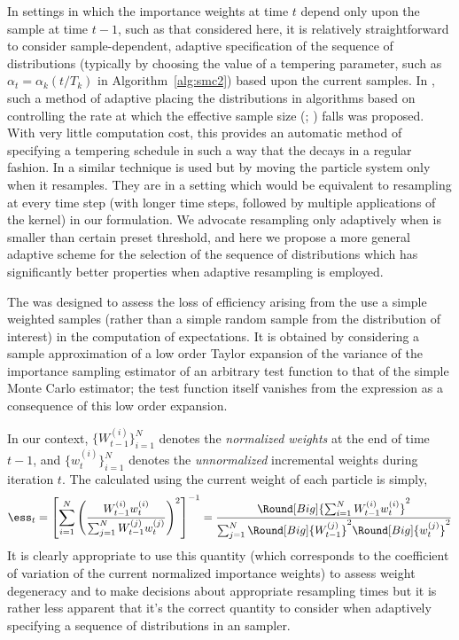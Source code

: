 In settings in which the importance weights at time $t$ depend only upon the
sample at time $t-1$, such as that considered here, it is relatively
straightforward to consider sample-dependent, adaptive specification of the
sequence of distributions (typically by choosing the value of a tempering
parameter, such as $\alpha_t = \alpha_k(t/T_k)$ in Algorithm~\ref{alg:smc2})
based upon the current samples. In \cite{Jasra:2010eh}, such a method of
adaptive placing the distributions in \smc algorithms based on controlling the
rate at which the effective sample size (\ess; \cite{Kong:1994ul}) falls was
proposed. With very little computation cost, this provides an automatic method
of specifying a tempering schedule in such a way that the \ess decays in a
regular fashion. In \cite[Algorithm 2]{Schafer:2011bx} a similar technique is
used but by moving the particle system only when it resamples. They are in a
setting which would be equivalent to resampling at every time step (with
longer time steps, followed by multiple applications of the \mcmc kernel) in
our formulation. We advocate resampling only adaptively when \ess is smaller
than certain preset threshold, and here we propose a more general adaptive
scheme for the selection of the sequence of distributions which has
significantly better properties when adaptive resampling is employed.

The \ess was designed to assess the loss of efficiency arising from the use a
simple weighted samples (rather than a simple random sample from the
distribution of interest) in the computation of expectations. It is obtained
by considering a sample approximation of a low order Taylor expansion of the
variance of the importance sampling estimator of an arbitrary test function to
that of the simple Monte Carlo estimator; the test function itself vanishes
from the expression as a consequence of this low order expansion.

In our context, $\{W_{t-1}^{(i)}\}_{i=1}^N$ denotes the \emph{normalized
  weights} at the end of time $t - 1$, and $\{w_t^{(i)}\}_{i=1}^N$ denotes the
\emph{unnormalized} incremental weights during iteration $t$. The \ess
calculated using the current weight of each particle is simply,
\begin{equation}
  \ess_t = \left[ {\sum_{i=1}^N\left( \frac{W_{t-1}^{(i)}
          w_t^{(i)}}{\sum_{j=1}^NW_{t-1}^{(j)}w_t^{(j)}}\right)^2}
  \right]^{-1} = \frac{\Round[Big]{\sum_{i=1}^NW_{t-1}^{(i)}w_t^{(i)}}^2}
  {\sum_{j=1}^N\Round[Big]{W_{t-1}^{(j)}}^2\Round[Big]{w_t^{(j)}}^2}
\end{equation}
It is clearly appropriate to use this quantity (which corresponds to the
coefficient of variation of the current normalized importance weights) to
assess weight degeneracy and to make decisions about appropriate resampling
times \cite{DelMoral:2012jq} but it is rather less apparent that it's
the correct quantity to consider when adaptively specifying a sequence of
distributions in an \smc sampler.

